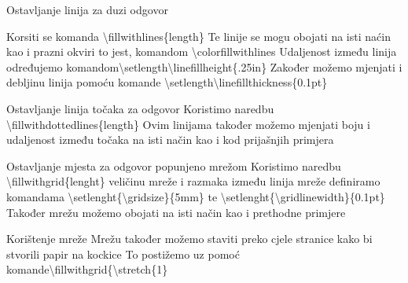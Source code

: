 \documentclass[addpoints,answers]{beamer}
\begin{document}
\begin{frame}{Ostavljanje linija za duzi odgovor}

Korsiti se komanda \color{blue}\textbackslash{fillwithlines\{length\}}\color{black}\newline\newline
Te linije se mogu obojati na isti naćin kao i prazni okviri to jest, komandom \color{blue}\textbackslash{colorfillwithlines}\color{black}
\newline
Udaljenost između linija određujemo komandom\color{blue}\textbackslash{setlength}\textbackslash{linefillheight\{.25in\}}\color{black}\newline
Zakođer možemo mjenjati i debljinu linija pomoću komande\color{blue} \textbackslash{setlength}\textbackslash{linefillthickness\{0.1pt\}}
\end{frame}

\begin{frame}{Ostavljanje linija točaka za odgovor}
Koristimo naredbu  \color{blue}\textbackslash{fillwithdottedlines\{length\}}\color{black}\newline
Ovim linijama također možemo mjenjati boju i udaljenost između točaka na isti način kao i kod prijašnjih primjera

\end{frame}

\begin{frame}{Ostavljanje mjesta za odgovor popunjeno mrežom}
Koristimo naredbu \color{blue}\textbackslash{fillwithgrid\{lenght\}}\color{black}\newline
veličinu mreže i razmaka između linija mreže definiramo komandama \color{blue}\textbackslash{setlenght\{\textbackslash{gridsize}\}\{5mm\}}\color{black} te \color{blue}\textbackslash{setlenght\{\textbackslash{gridlinewidth}\}\{0.1pt\}}\color{black}
\newline
Također mrežu možemo obojati na isti način kao i prethodne primjere

\end{frame}
\begin{frame}{Korištenje mreže}
Mrežu također možemo staviti preko cjele stranice kako bi stvorili papir na kockice
\newline
To postižemo uz pomoć komande\color{blue}\textbackslash{fillwithgrid\{\textbackslash{stretch\{1\}}}
\end{frame}




%
%	
%
%
\end{document}
